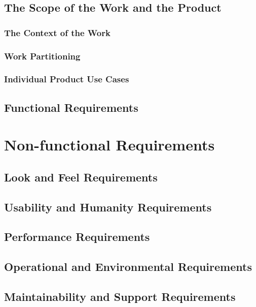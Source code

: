 \documentclass[12pt, titlepage]{article}
\begin{document}
\subsection{The Scope of the Work and the Product}

\subsubsection{The Context of the Work}

\subsubsection{Work Partitioning}

\subsubsection{Individual Product Use Cases}

\subsection{Functional Requirements}

\section{Non-functional Requirements}

\subsection{Look and Feel Requirements}

\subsection{Usability and Humanity Requirements}

\subsection{Performance Requirements}

\subsection{Operational and Environmental Requirements}

\subsection{Maintainability and Support Requirements}
\end{document}
